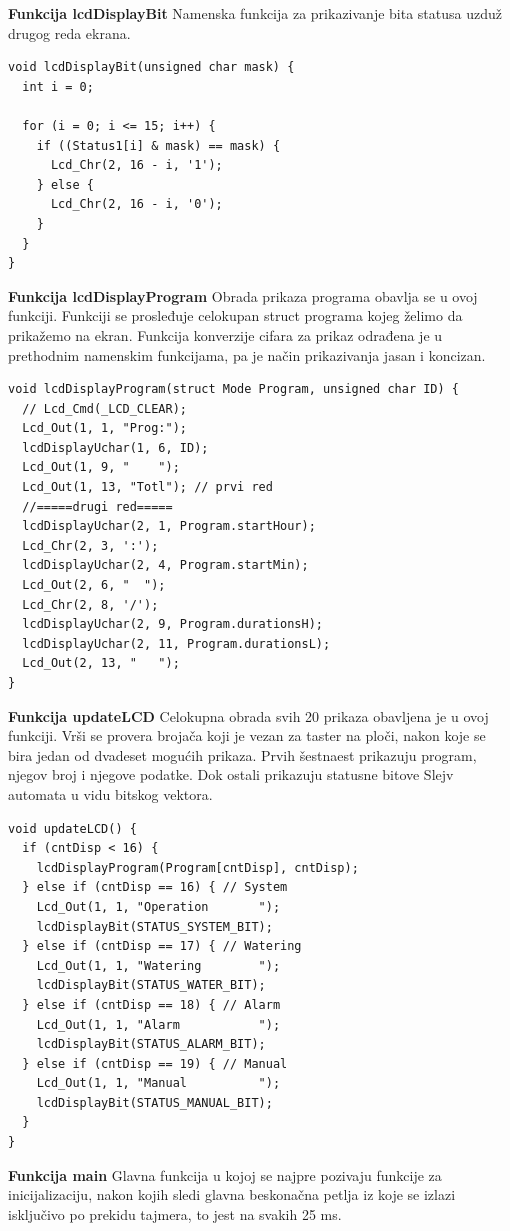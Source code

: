 \documentclass[12pt]{article}
\numberwithin{figure}{section}
\begin{document}
\textbf{Funkcija lcdDisplayBit}
Namenska funkcija za prikazivanje bita statusa uzduž drugog reda ekrana.
\begin{verbatim}
void lcdDisplayBit(unsigned char mask) {
  int i = 0;

  for (i = 0; i <= 15; i++) {
    if ((Status1[i] & mask) == mask) {
      Lcd_Chr(2, 16 - i, '1');
    } else {
      Lcd_Chr(2, 16 - i, '0');
    }
  }
}
\end{verbatim}
\textbf{Funkcija lcdDisplayProgram} \newline
Obrada prikaza programa obavlja se u ovoj funkciji.
Funkciji se prosleđuje celokupan struct programa kojeg želimo da prikažemo na ekran. 
Funkcija konverzije cifara za prikaz odrađena je u prethodnim namenskim funkcijama, pa je način prikazivanja jasan i koncizan.
\begin{verbatim}
void lcdDisplayProgram(struct Mode Program, unsigned char ID) {
  // Lcd_Cmd(_LCD_CLEAR);
  Lcd_Out(1, 1, "Prog:");
  lcdDisplayUchar(1, 6, ID);
  Lcd_Out(1, 9, "    ");
  Lcd_Out(1, 13, "Totl"); // prvi red
  //=====drugi red=====
  lcdDisplayUchar(2, 1, Program.startHour);
  Lcd_Chr(2, 3, ':');
  lcdDisplayUchar(2, 4, Program.startMin);
  Lcd_Out(2, 6, "  ");
  Lcd_Chr(2, 8, '/');
  lcdDisplayUchar(2, 9, Program.durationsH);
  lcdDisplayUchar(2, 11, Program.durationsL);
  Lcd_Out(2, 13, "   ");
}
\end{verbatim}
\textbf{Funkcija updateLCD} \newline
Celokupna obrada svih 20 prikaza obavljena je u ovoj funkciji.
Vrši se provera brojača koji je vezan za taster na ploči, nakon koje se bira jedan od dvadeset mogućih prikaza.
Prvih šestnaest prikazuju program, njegov broj i njegove podatke.
Dok ostali prikazuju statusne bitove Slejv automata u vidu bitskog vektora.
\begin{verbatim}
void updateLCD() {
  if (cntDisp < 16) {
    lcdDisplayProgram(Program[cntDisp], cntDisp);
  } else if (cntDisp == 16) { // System
    Lcd_Out(1, 1, "Operation       ");
    lcdDisplayBit(STATUS_SYSTEM_BIT);
  } else if (cntDisp == 17) { // Watering
    Lcd_Out(1, 1, "Watering        ");
    lcdDisplayBit(STATUS_WATER_BIT);
  } else if (cntDisp == 18) { // Alarm
    Lcd_Out(1, 1, "Alarm           ");
    lcdDisplayBit(STATUS_ALARM_BIT);
  } else if (cntDisp == 19) { // Manual
    Lcd_Out(1, 1, "Manual          ");
    lcdDisplayBit(STATUS_MANUAL_BIT);
  }
}
\end{verbatim}
\textbf{Funkcija main} \newline
Glavna funkcija u kojoj se najpre pozivaju funkcije za inicijalizaciju, nakon kojih sledi glavna beskonačna petlja iz koje se izlazi isključivo po prekidu tajmera, to jest na svakih 25 ms.
\end{document}
